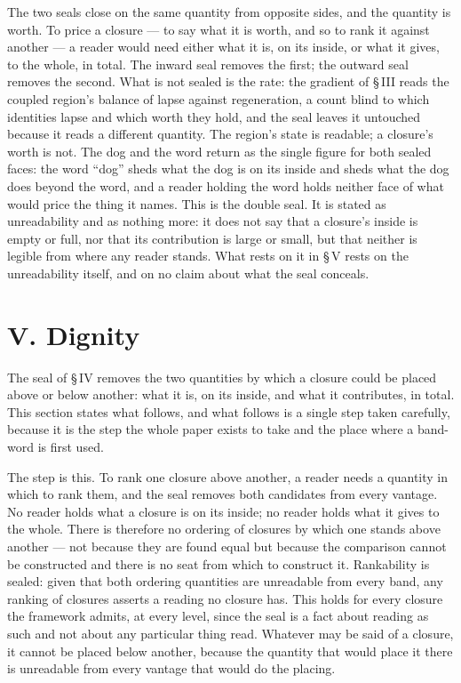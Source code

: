 \documentclass[11pt,oneside]{report}
\theoremstyle{definition}
\theoremstyle{remark}
\begin{document}
The two seals close on the same quantity from opposite sides, and the quantity is worth. To price a closure --- to say what it is worth, and so to rank it against another --- a reader would need either what it is, on its inside, or what it gives, to the whole, in total. The inward seal removes the first; the outward seal removes the second. What is not sealed is the rate: the gradient of \S\,III reads the coupled region's balance of lapse against regeneration, a count blind to which identities lapse and which worth they hold, and the seal leaves it untouched because it reads a different quantity. The region's state is readable; a closure's worth is not. The dog and the word return as the single figure for both sealed faces: the word ``dog'' sheds what the dog is on its inside and sheds what the dog does beyond the word, and a reader holding the word holds neither face of what would price the thing it names. This is the double seal. It is stated as unreadability and as nothing more: it does not say that a closure's inside is empty or full, nor that its contribution is large or small, but that neither is legible from where any reader stands. What rests on it in \S\,V rests on the unreadability itself, and on no claim about what the seal conceals.

\section*{V. Dignity}

The seal of \S\,IV removes the two quantities by which a closure could be placed above or below another: what it is, on its inside, and what it contributes, in total. This section states what follows, and what follows is a single step taken carefully, because it is the step the whole paper exists to take and the place where a band-word is first used.

The step is this. To rank one closure above another, a reader needs a quantity in which to rank them, and the seal removes both candidates from every vantage. No reader holds what a closure is on its inside; no reader holds what it gives to the whole. There is therefore no ordering of closures by which one stands above another --- not because they are found equal but because the comparison cannot be constructed and there is no seat from which to construct it. Rankability is sealed: given that both ordering quantities are unreadable from every band, any ranking of closures asserts a reading no closure has. This holds for every closure the framework admits, at every level, since the seal is a fact about reading as such and not about any particular thing read. Whatever may be said of a closure, it cannot be placed below another, because the quantity that would place it there is unreadable from every vantage that would do the placing.
\end{document}
